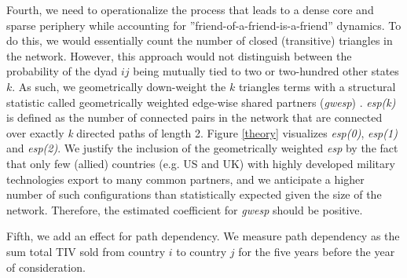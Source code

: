 \documentclass[12pt, letterpaper]{article}
\numberwithin{equation}{section}
\begin{document}
Fourth, we need to operationalize the process that leads to a dense core and sparse periphery while accounting for ''friend-of-a-friend-is-a-friend'' dynamics. 
To do this, we would essentially count the number of closed (transitive) triangles in the network. 
However, this approach would not distinguish between the probability of the dyad $ij$ being mutually tied to two or two-hundred other states $k$. 
As such, we geometrically down-weight the $k$ triangles terms with a structural statistic called geometrically weighted edge-wise shared partners (\textit{gwesp}) \citep{HunHan:06}. 
\textit{esp(k)} is defined as the number of connected pairs in the network that are connected over exactly \textit{k} directed paths of length 2. 
Figure \ref{theory} visualizes \textit{esp(0)}, \textit{esp(1)} and \textit{esp(2)}.  
We justify the inclusion of the geometrically weighted \textit{esp} by the fact that only few (allied) countries (e.g. US and UK) with highly developed military technologies export to many common partners, 
and we anticipate a higher number of such configurations than statistically expected given the size of the network. Therefore, the estimated coefficient for \textit{gwesp} should be positive. 

Fifth, we add an effect for path dependency. 
We measure path dependency as the sum total TIV sold from country $i$ to country $j$ for the five years before the year of consideration. 
\end{document}
